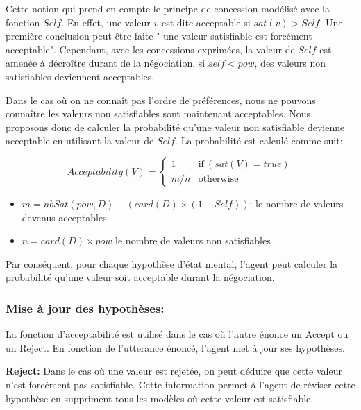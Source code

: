 \documentclass{llncs}
\begin{document}
	Cette notion qui prend en compte le principe de concession modélisé avec la fonction $Self$. En effet, une valeur $v$ est dite acceptable si $sat(v) >Self$. Une première conclusion peut être faite " une valeur satisfiable est forcément acceptable". Cependant, avec les concessions exprimées, la valeur de $Self$ est amenée à décroître durant de la négociation, si $self<pow$, des valeurs non satisfiables deviennent acceptables. 

	Dans le cas où on ne connaît pas l'ordre de préférences, nous ne pouvons connaître les valeurs non satisfiables sont maintenant acceptables. Nous proposons donc de calculer la probabilité qu'une valeur non satisfiable devienne acceptable en utilisant la valeur de $Self$. La probabilité est calculé comme suit:
	
	
	\begin{equation}
	Acceptability(V) =  \left\{\begin{array}{ll}
	1 & \mathrm{if\ } (sat(V) = true)\\
	m/n & \mathrm{otherwise}
	\end{array}\right.
	\end{equation}
	\begin{itemize}
		\item $m= nbSat(pow,D) - (card(D) \times (1-Self)) $: le nombre de valeurs devenus acceptables
		\item $n= card(D) \times pow $ le nombre de valeurs non satisfiables
	\end{itemize}
	
	Par conséquent, pour chaque hypothèse d'état mental, l'agent peut calculer la probabilité qu'une valeur soit acceptable durant la négociation.
	
	\subsubsection{Mise à jour des hypothèses:}
		La fonction d'acceptabilité est utilisé dans le cas où l'autre énonce un Accept ou un Reject. En fonction de l'utterance énoncé, l'agent met à jour ses hypothèses. 
		
		\textbf{Reject:} Dans le cas où une valeur est rejetée, on peut déduire que cette valeur n'est forcément pas satisfiable. Cette information permet à l'agent de réviser cette hypothèse en suppriment tous les modèles où cette valeur est satisfiable.
		
\end{document}
